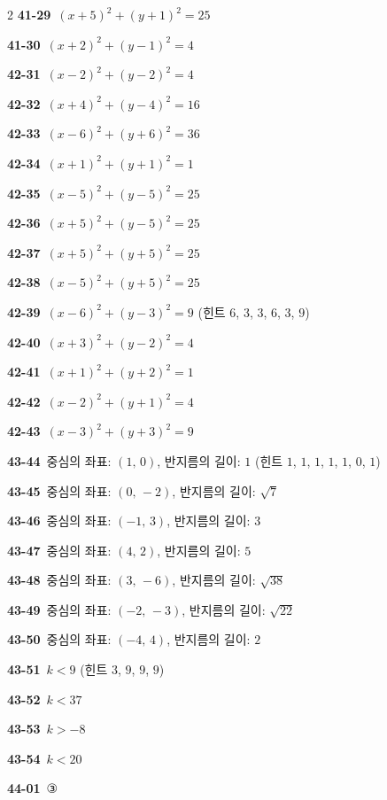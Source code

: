 \documentclass[10pt,a4paper]{article}
\begin{document}
\begin{multicols}{2}
\noindent\textbf{41-29}\ $(x+5)^2+(y+1)^2=25$\par
\noindent\textbf{41-30}\ $(x+2)^2+(y-1)^2=4$\par
\noindent\textbf{42-31}\ $(x-2)^2+(y-2)^2=4$\par
\noindent\textbf{42-32}\ $(x+4)^2+(y-4)^2=16$\par
\noindent\textbf{42-33}\ $(x-6)^2+(y+6)^2=36$\par
\noindent\textbf{42-34}\ $(x+1)^2+(y+1)^2=1$\par
\noindent\textbf{42-35}\ $(x-5)^2+(y-5)^2=25$\par
\noindent\textbf{42-36}\ $(x+5)^2+(y-5)^2=25$\par
\noindent\textbf{42-37}\ $(x+5)^2+(y+5)^2=25$\par
\noindent\textbf{42-38}\ $(x-5)^2+(y+5)^2=25$\par
\noindent\textbf{42-39}\ $(x-6)^2+(y-3)^2=9$ (힌트 $6$, $3$, $3$, $6$, $3$, $9$)\par
\noindent\textbf{42-40}\ $(x+3)^2+(y-2)^2=4$\par
\noindent\textbf{42-41}\ $(x+1)^2+(y+2)^2=1$\par
\noindent\textbf{42-42}\ $(x-2)^2+(y+1)^2=4$\par
\noindent\textbf{42-43}\ $(x-3)^2+(y+3)^2=9$\par
\noindent\textbf{43-44}\ 중심의 좌표: $(1,\,0)$, 반지름의 길이: $1$ (힌트 $1$, $1$, $1$, $1$, $1$, $0$, $1$)\par
\noindent\textbf{43-45}\ 중심의 좌표: $(0,\,-2)$, 반지름의 길이: $\sqrt{7}$\par
\noindent\textbf{43-46}\ 중심의 좌표: $(-1,\,3)$, 반지름의 길이: $3$\par
\noindent\textbf{43-47}\ 중심의 좌표: $(4,\,2)$, 반지름의 길이: $5$\par
\noindent\textbf{43-48}\ 중심의 좌표: $(3,\,-6)$, 반지름의 길이: $\sqrt{38}$\par
\noindent\textbf{43-49}\ 중심의 좌표: $(-2,\,-3)$, 반지름의 길이: $\sqrt{22}$\par
\noindent\textbf{43-50}\ 중심의 좌표: $(-4,\,4)$, 반지름의 길이: $2$\par
\noindent\textbf{43-51}\ $k<9$ (힌트 $3$, $9$, $9$, $9$)\par
\noindent\textbf{43-52}\ $k<37$\par
\noindent\textbf{43-53}\ $k>-8$\par
\noindent\textbf{43-54}\ $k<20$\par
\noindent\textbf{44-01}\ ③\par

\end{multicols}
\end{document}
